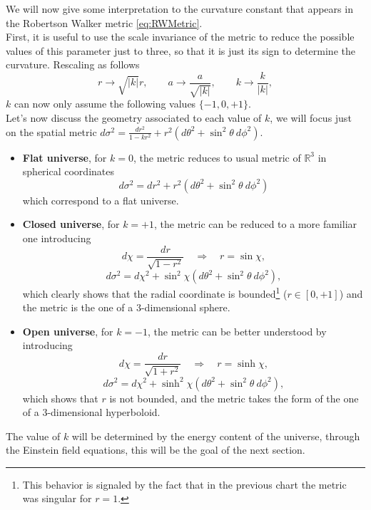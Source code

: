 We will now give some interpretation to the curvature constant that appears in the Robertson Walker metric \eqref{eq:RWMetric}.\\First, it is useful to use the scale invariance of the metric to reduce the possible values of this parameter just to three, so that it is just its sign to determine the curvature. Rescaling as follows 
\begin{equation*}
    r\rightarrow\sqrt{|k|}r,\qquad a\rightarrow\frac{a}{\sqrt{|k|}},\qquad k\rightarrow\frac{k}{|k|},
\end{equation*}  
$k$ can now only assume the following values $\{-1,0,+1\}$. \\
Let's now discuss the geometry associated to each value of $k$, we will focus just on the spatial metric $d\sigma^2=\frac{dr^2}{1-kr^2}+r^2(d\theta^2+\sin^2\theta\ d\phi^2)$.
\begin{itemize}
    \item \textbf{Flat universe}, for $k=0$, the metric reduces to usual metric of $\mathbb{R}^3$ in spherical coordinates $$d\sigma^2= dr^2+r^2(d\theta^2+\sin^2\theta\ d\phi^2)$$ which correspond to a flat universe.
    \item \textbf{Closed universe}, for $k=+1$, the metric can be reduced to a more familiar one introducing $$d\chi=\frac{dr}{\sqrt{1-r^2}}\quad\Rightarrow\quad r=\sin\chi,$$$$d\sigma^2=d\chi^2+\sin^2\chi(d\theta^2+\sin^2\theta\ d\phi^2),$$which clearly shows that the radial coordinate is bounded\footnote{This behavior is signaled by the fact that in the previous chart the metric was singular for $r=1$.} ($r\in[0,+1]$) and the metric is the one of a $3$-dimensional sphere.
    \item \textbf{Open universe}, for $k=-1$, the metric can be better understood by introducing$$d\chi=\frac{dr}{\sqrt{1+r^2}}\quad\Rightarrow\quad r=\sinh\chi,$$$$d\sigma^2=d\chi^2+\sinh^2\chi(d\theta^2+\sin^2\theta\ d\phi^2),$$ which shows that $r$ is not bounded, and the metric takes the form of the one of a $3$-dimensional hyperboloid.
\end{itemize}
The value of $k$ will be determined by the energy content of the universe, through the Einstein field equations, this will be the goal of the next section.
